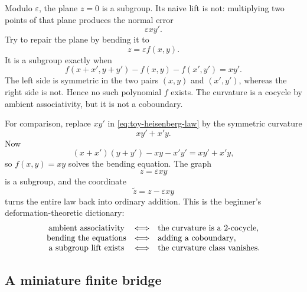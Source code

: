 \documentclass[11pt]{amsart}
\theoremstyle{definition}
\theoremstyle{remark}
\begin{document}
Modulo \(\varepsilon\), the plane \(z=0\) is a subgroup.  Its naive lift
is not: multiplying two points of that plane produces the normal error
\[
 \varepsilon xy'.
\]
Try to repair the plane by bending it to
\[
 z=\varepsilon f(x,y).
\]
It is a subgroup exactly when
\begin{equation}\label{eq:toy-coboundary-equation}
 f(x+x',y+y')-f(x,y)-f(x',y')=xy'.
\end{equation}
The left side is symmetric in the two pairs \((x,y)\) and
\((x',y')\), whereas the right side is not.  Hence no such polynomial
\(f\) exists.  The curvature is a cocycle by ambient associativity, but
it is not a coboundary.

For comparison, replace \(xy'\) in
\eqref{eq:toy-heisenberg-law} by the symmetric curvature
\[
 xy'+x'y.
\]
Now
\[
 (x+x')(y+y')-xy-x'y'=xy'+x'y,
\]
so \(f(x,y)=xy\) solves the bending equation.  The graph
\[
 z=\varepsilon xy
\]
is a subgroup, and the coordinate
\[
 \widetilde z=z-\varepsilon xy
\]
turns the entire law back into ordinary addition.  This is the
beginner's deformation-theoretic dictionary:
\[
 \begin{array}{c@{\quad\Longleftrightarrow\quad}l}
  \text{ambient associativity}
    &\text{the curvature is a \(2\)-cocycle},\\
  \text{bending the equations}
    &\text{adding a coboundary},\\
  \text{a subgroup lift exists}
    &\text{the curvature class vanishes}.
 \end{array}
\]

\subsection{A miniature finite bridge}
\end{document}
